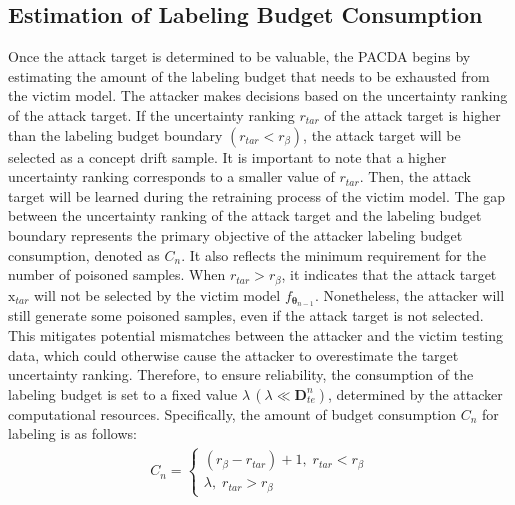 \documentclass[conference,compsoc]{IEEEtran} %
\begin{document}
\subsection{Estimation of Labeling Budget Consumption}
\label{Sec: Surrogate Model Training}
Once the attack target is determined to be valuable, the PACDA begins by estimating the amount of the labeling budget that needs to be exhausted from the victim model.
The attacker makes decisions based on the uncertainty ranking of the attack target.
If the uncertainty ranking $r_{tar}$ of the attack target is higher than the labeling budget boundary $(r_{tar} < r_{\beta})$, the attack target will be selected as a concept drift sample.
It is important to note that a higher uncertainty ranking corresponds to a smaller value of $r_{tar}$.
Then, the attack target will be learned during the retraining process of the victim model.
The gap between the uncertainty ranking of the attack target and the labeling budget boundary represents the primary objective of the attacker  labeling budget consumption, denoted as $C_{n}$.
It also reflects the minimum requirement for the number of poisoned samples.
When $r_{tar} > r_{\beta}$, it indicates that the attack target $\bm{\mathrm{x}}_{tar}$ will not be selected by the victim model $f_{\bm{\theta}_{n-1}}$.
Nonetheless, the attacker will still generate some poisoned samples, even if the attack target is not selected.
This mitigates potential mismatches between the attacker  and the victim  testing data, which could otherwise cause the attacker to overestimate the target  uncertainty ranking.
Therefore, to ensure reliability, the consumption of the labeling budget is set to a fixed value $\lambda \, (\lambda \ll \bm{D}_{te}^{n})$, determined by the attacker  computational resources.
Specifically, the amount of budget consumption $C_{n}$ for labeling is as follows:
\begin{align}
	C_{n} =
	\begin{cases} 
		(r_{\beta}-r_{tar}) + 1, \; r_{tar} < r_{\beta} \\
		\lambda , \; r_{tar} > r_{\beta}
	\end{cases}
\end{align}
\end{document}
